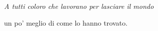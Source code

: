 \thispagestyle{empty}


\begin{flushright}\em
A tutti coloro che lavorano per lasciare il mondo

un po' meglio di come lo hanno trovato.
\end{flushright}

